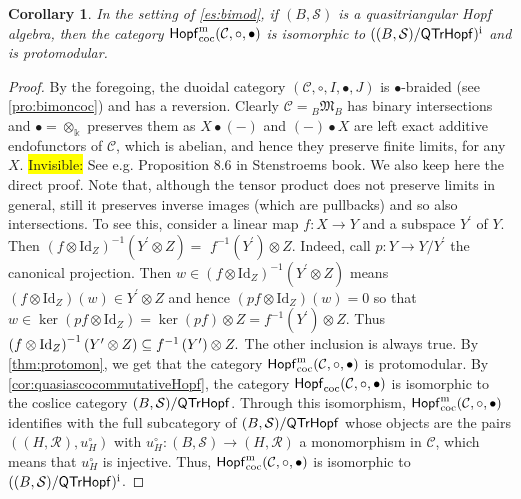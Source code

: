 \documentclass[nosumlimits,twoside]{amsart}
\newtheorem{corollary}[corollary]{\sc Corollary}
\theoremstyle{definition}
\theoremstyle{remark}
\newenvironment{invisible}{{\noindent\sc \colorbox{yellow}{Invisible:}\;}\color{gray}}{\medskip}
\newcommand{\rd}[1]{{\color{red}{#1}}}
\newcommand{\Cc}{\mathcal{C}}
\newcommand{\Rr}{\mathcal{R}}
\newcommand{\Ss}{\mathcal{S}}
\def\cHopfmon{{\sf Hopf}_{\mathrm{coc}}}
\def\QTrHopf{{\sf QTrHopf}}
\begin{document}
\begin{corollary}%
\label{cor:cosliceQTrHprot}
In the setting of \cref{es:bimod}, if $(B,\Ss)$ is a quasitriangular Hopf algebra, then the category  $\cHopfmon^\mathrm{m}(\Cc,\circ,\bullet)$ is isomorphic to $((B,\Ss)/\QTrHopf)^{\mathrm{i}}$ and is protomodular.
\end{corollary}

\begin{proof}
By the foregoing, the duoidal category $(\Cc,\circ,I,\bullet,J)$  is $\bullet$-braided (see \cref{pro:bimoncoc}) and has a reversion. Clearly $\Cc={}_B\mathfrak{M}_B$ has binary intersections and $\bullet=\otimes_\Bbbk$ preserves them as $X\bullet(-)$ and $(-)\bullet X$ are left exact additive endofunctors of $\Cc$, which is abelian, and hence they preserve finite limits, for any $X$.
\begin{invisible}
See e.g. Proposition 8.6 in Stenstroems book. We also keep here the direct proof.
Note that, although the tensor product does not preserve limits in general,
still it preserves inverse images (which are pullbacks) and so also intersections. To see this,
consider a linear map  $f:X\rightarrow Y$ and  a subspace $Y^{\prime }$ of $%
Y.$ Then $\left( f\otimes \mathrm{Id}_{Z}\right) ^{-1}\left( Y^{\prime
}\otimes Z\right) =$ $f^{-1}\left( Y^{\prime }\right) \otimes Z.$ Indeed,
call $p:Y\rightarrow Y/Y^{\prime }$ the canonical projection. Then $w\in
\left( f\otimes \mathrm{Id}_{Z}\right) ^{-1}\left( Y^{\prime }\otimes
Z\right) $ means $\left( f\otimes \mathrm{Id}_{Z}\right) \left( w\right) \in
Y^{\prime }\otimes Z$ and hence $\left( pf\otimes \mathrm{Id}_{Z}\right)
\left( w\right) =0$ so that $w\in \ker \left( pf\otimes \mathrm{Id}%
_{Z}\right) =\ker \left( pf\right) \otimes
Z=f^{-1}\left( Y^{\prime }\right) \otimes Z.$ Thus $\left( f\otimes \mathrm{%
Id}_{Z}\right) ^{-1}\left( Y^{\prime }\otimes Z\right) \subseteq
f^{-1}\left( Y^{\prime }\right) \otimes Z.$ The other inclusion is always
true.
\end{invisible}
By \cref{thm:protomon}, we get that the category $\cHopfmon^{\mathrm{m}}(\Cc,\circ, \bullet )$ is protomodular. By \cref{cor:quasiascocommutativeHopf}, the category $\cHopfmon(\Cc,\circ,\bullet)$ is isomorphic to the coslice category $(B,\Ss)/\QTrHopf$. Through this isomorphism, $\cHopfmon^{\mathrm{m}}(\Cc,\circ, \bullet )$ identifies with the full subcategory of $(B,\Ss)/\QTrHopf$ whose objects are the pairs  $((H,\Rr),u_H^\circ)$ with  $u_H^\circ:(B,\Ss)\to (H,\Rr)$ a monomorphism in $\Cc$, which means that $u_H^\circ$ is injective. Thus, $\cHopfmon^{\mathrm{m}}(\Cc,\circ, \bullet )$ is isomorphic to $((B,\Ss)/\QTrHopf)^{\mathrm{i}}$.
\end{proof}
\end{document}
